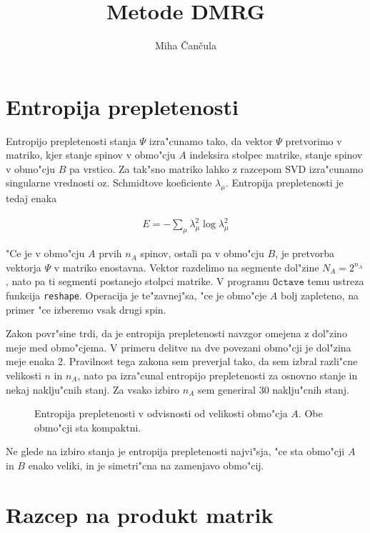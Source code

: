 \documentclass[a4paper,10pt]{article}
\title{Metode \textsc{DMRG}}
\author{Miha \v Can\v cula}
\begin{document}
\maketitle

\section{Entropija prepletenosti}

Entropijo prepletenosti stanja $\Psi$ izra"cunamo tako, da vektor $\Psi$ pretvorimo v matriko, kjer stanje spinov v obmo"cju $A$ indeksira stolpec matrike, stanje spinov v obmo"cju $B$ pa vrstico. Za tak"sno matriko lahko z razcepom \textsc{SVD} izra"cunamo singularne vrednosti oz. Schmidtove koeficiente $\lambda_\mu$. Entropija prepletenosti je tedaj enaka

\begin{align}
 E = -\sum_\mu \lambda_\mu^2 \log \lambda_\mu^2
\end{align}

"Ce je v obmo"cju $A$ prvih $n_A$ spinov, ostali pa v obmo"cju $B$, je pretvorba vektorja $\Psi$ v matriko enostavna. Vektor razdelimo na segmente dol"zine $N_A = 2^{n_A}$, nato pa ti segmenti postanejo stolpci matrike. V programu $\texttt{Octave}$ temu ustreza funkcija \texttt{reshape}. Operacija je te"zavnej"sa, "ce je obmo"cje $A$ bolj zapleteno, na primer "ce izberemo vsak drugi spin. 

Zakon povr"sine trdi, da je entropija prepletenosti navzgor omejena z dol"zino meje med obmo"cjema. V primeru delitve na dve povezani obmo"cji je dol"zina meje enaka 2. Pravilnost tega zakona sem preverjal tako, da sem izbral razli"cne velikosti $n$ in $n_A$, nato pa izra"cunal entropijo prepletenosti za osnovno stanje in nekaj naklju"cnih stanj. Za vsako izbiro $n_A$ sem generiral 30 naklju"cnih stanj. 

\begin{figure}[H]
 \centering
 
 \caption{Entropija prepletenosti v odvisnosti od velikosti obmo"cja $A$. Obe obmo"cji sta kompaktni. }
 \label{fig:entropija}
\end{figure}

Ne glede na izbiro stanja je entropija prepletenosti najvi"sja, "ce sta obmo"cji $A$ in $B$ enako veliki, in je simetri"cna na zamenjavo obmo"cij. 

\section{Razcep na produkt matrik}
\end{document}
